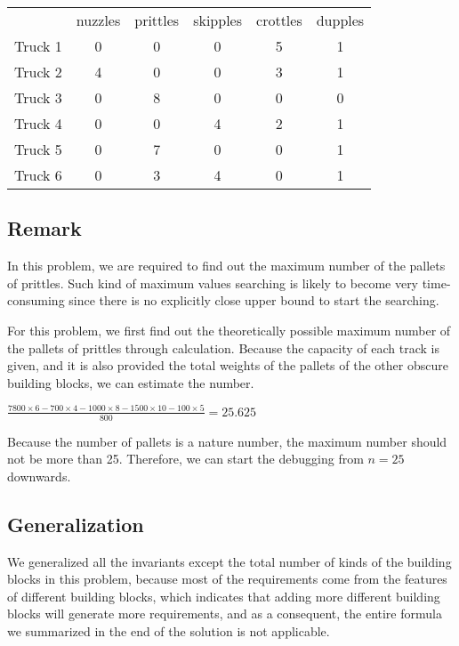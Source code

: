 \documentclass[11pt]{article}
\begin{document}
\begin{table}
  \centering
  \begin{tabular}{|l|c|c|c|c|c|}
    \hline
     & nuzzles & prittles & skipples & crottles & dupples \\
    Truck 1 & 0 & 0 & 0 & 5 & 1 \\
    Truck 2 & 4 & 0 & 0 & 3 & 1 \\
    Truck 3 & 0 & 8 & 0 & 0 & 0 \\
    Truck 4 & 0 & 0 & 4 & 2 & 1 \\
    Truck 5 & 0 & 7 & 0 & 0 & 1 \\
    Truck 6 & 0 & 3 & 4 & 0 & 1 \\
    \hline
  \end{tabular}
\end{table}

\subsection*{Remark}
In this problem, we are required to find out the maximum number of the pallets of prittles. Such kind of maximum values searching is likely to become very time-consuming since there is no explicitly close upper bound to start the searching.

For this problem, we first find out the theoretically possible maximum number of the pallets of prittles through calculation. Because the capacity of each track is given, and it is also provided the total weights of the pallets of the other obscure building blocks, we can estimate the number.

  $\frac{7800 \times 6 - 700\times4 - 1000\times8 - 1500\times10 - 100\times5}{800} = 25.625$

Because the number of pallets is a nature number, the maximum number should not be more than 25. Therefore, we can start the debugging from $n = 25$ downwards.

\subsection*{Generalization}

We generalized all the invariants except the total number of kinds of the building blocks in this problem, because most of the requirements come from the features of different building blocks, which indicates that adding more different building blocks will generate more requirements, and as a consequent, the entire formula we summarized in the end of the solution is not applicable.
\end{document}
